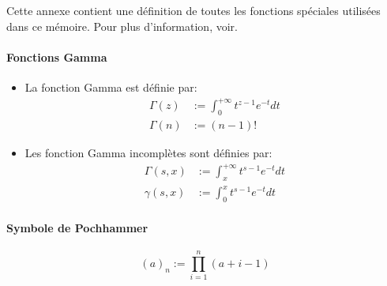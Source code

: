 



\label{special_functions}

Cette annexe contient une définition de toutes les fonctions spéciales utilisées dans ce mémoire. Pour plus d'information, voir\cite{NIST:DLMF}.
\paragraph{Fonctions Gamma}
\begin{itemize}
    \item La fonction Gamma est définie par:
    \[
        \begin{aligned}
            \Gamma(z)&:=\int_0^{+\infty}t^{z-1}e^{-t}dt \\
            \Gamma(n)&:=(n-1)!
        \end{aligned}
    \]
    \item Les fonction Gamma incomplètes sont définies par:
    \[
    \begin{aligned}
        \Gamma(s,x)&:=\int_x^{+\infty}t^{s-1}e^{-t}dt \\
        \gamma(s,x)&:=\int_0^x t^{s-1}e^{-t}dt
    \end{aligned}
    \] 
\end{itemize}

\paragraph{Symbole de Pochhammer}
\[
{(a)}_n:=\prod_{i=1}^n (a+i-1)
\]

